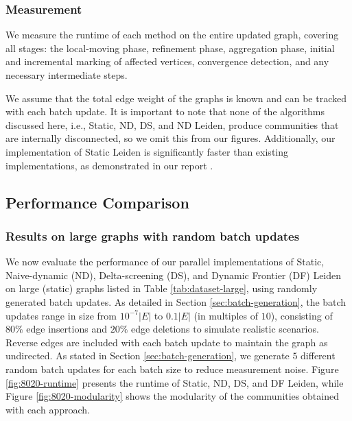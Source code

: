 \subsubsection{Measurement}
\label{sec:measurement}

We measure the runtime of each method on the entire updated graph, covering all stages: the local-moving phase, refinement phase, aggregation phase, initial and incremental marking of affected vertices, convergence detection, and any necessary intermediate steps. We assume that the total edge weight of the graphs is known and can be tracked with each batch update. It is important to note that none of the algorithms discussed here, i.e., Static, ND, DS, and ND Leiden, produce communities that are internally disconnected, so we omit this from our figures. Additionally, our implementation of Static Leiden is significantly faster than existing implementations, as demonstrated in our report \cite{sahu2023gveleiden}.








\subsection{Performance Comparison}
\label{sec:performance-comparison}

\subsubsection{Results on large graphs with random batch updates}

We now evaluate the performance of our parallel implementations of Static, Naive-dynamic (ND), Delta-screening (DS), and Dynamic Frontier (DF) Leiden on large (static) graphs listed in Table \ref{tab:dataset-large}, using randomly generated batch updates. As detailed in Section \ref{sec:batch-generation}, the batch updates range in size from $10^{-7}|E|$ to $0.1|E|$ (in multiples of $10$), consisting of $80\%$ edge insertions and $20\%$ edge deletions to simulate realistic scenarios. Reverse edges are included with each batch update to maintain the graph as undirected. As stated in Section \ref{sec:batch-generation}, we generate $5$ different random batch updates for each batch size to reduce measurement noise. Figure \ref{fig:8020-runtime} presents the runtime of Static, ND, DS, and DF Leiden, while Figure \ref{fig:8020-modularity} shows the modularity of the communities obtained with each approach.

